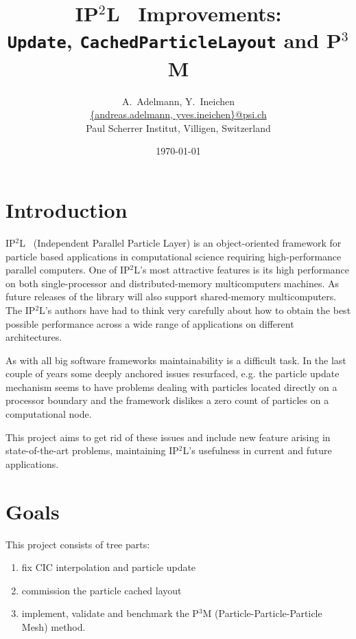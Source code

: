 \documentclass[10pt,a4paper]{scrartcl}
\newcommand{\ippl}{\textsc{IP$^2$L}}
\begin{document}
\title{\ippl~ Improvements: \\ \texttt{Update}, \texttt{CachedParticleLayout}
and P$^3$M}
\author{A.~Adelmann, Y.~Ineichen\\ 
        \url{{andreas.adelmann, yves.ineichen}@psi.ch} \\
        \small{Paul Scherrer Institut, Villigen, Switzerland}
}
\date{\today}
\maketitle


\section{Introduction}

\ippl~ (Independent Parallel Particle Layer) is an object-oriented framework for
particle based applications in computational science requiring high-performance
parallel computers. One of \ippl's most attractive features is its high
performance on both single-processor and distributed-memory multicomputers
machines. As future releases of the library will also support shared-memory
multicomputers. The \ippl's authors have had to think very carefully about how to
obtain the best possible performance across a wide range of applications on
different architectures.

As with all big software frameworks maintainability is a difficult task. In the
last couple of years some deeply anchored issues resurfaced, e.g. the particle
update mechanism seems to have problems dealing with particles located directly
on a processor boundary and the framework dislikes a zero count of particles on a computational node.


This project aims to get rid of these issues and include new feature arising
in state-of-the-art problems, maintaining \ippl's usefulness in current and future
applications.

\section{Goals}

This project consists of tree parts:
\begin{enumerate}
\item fix CIC interpolation and particle update 
\item commission the particle cached layout
\item implement, validate and benchmark the P$^3$M (Particle-Particle-Particle Mesh) method.
\end{enumerate}
\end{document}
